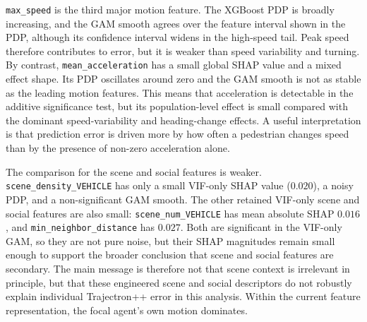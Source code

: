 \documentclass[12pt]{article}
\begin{document}
\texttt{max\_speed} is the third major motion feature. The XGBoost PDP is broadly increasing, and the GAM smooth agrees over the feature interval shown in the PDP, although its confidence interval widens in the high-speed tail. Peak speed therefore contributes to error, but it is weaker than speed variability and turning. By contrast, \texttt{mean\_acceleration} has a small global SHAP value and a mixed effect shape. Its PDP oscillates around zero and the GAM smooth is not as stable as the leading motion features. This means that acceleration is detectable in the additive significance test, but its population-level effect is small compared with the dominant speed-variability and heading-change effects. A useful interpretation is that prediction error is driven more by how often a pedestrian changes speed than by the presence of non-zero acceleration alone.

The comparison for the scene and social features is weaker. \texttt{scene\_density\_VEHICLE} has only a small VIF-only SHAP value ($0.020$), a noisy PDP, and a non-significant GAM smooth. The other retained VIF-only scene and social features are also small: \texttt{scene\_num\_VEHICLE} has mean absolute SHAP $0.016$, and \texttt{min\_neighbor\_distance} has $0.027$. Both are significant in the VIF-only GAM, so they are not pure noise, but their SHAP magnitudes remain small enough to support the broader conclusion that scene and social features are secondary. The main message is therefore not that scene context is irrelevant in principle, but that these engineered scene and social descriptors do not robustly explain individual Trajectron++ error in this analysis. Within the current feature representation, the focal agent's own motion dominates.
\end{document}

